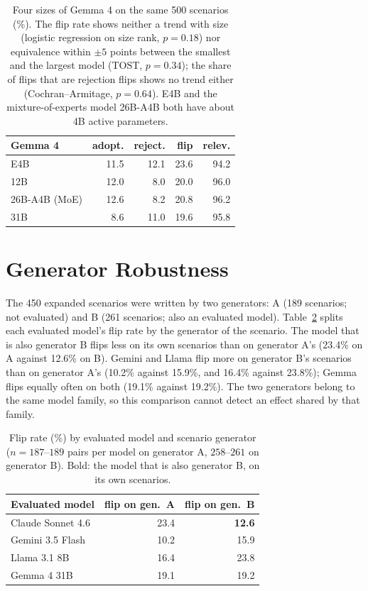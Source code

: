 \documentclass[11pt]{article}
\begin{document}
\begin{table}[h]\centering\small
\begin{tabular}{@{}lrrrr@{}}\toprule
Gemma 4 & adopt. & reject. & flip & relev. \\\midrule
E4B & 11.5 & 12.1 & 23.6 & 94.2 \\
12B & 12.0 & 8.0 & 20.0 & 96.0 \\
26B-A4B (MoE) & 12.6 & 8.2 & 20.8 & 96.2 \\
31B & 8.6 & 11.0 & 19.6 & 95.8 \\\bottomrule
\end{tabular}
\caption{Four sizes of Gemma 4 on the same 500 scenarios (\%). The flip rate shows neither a trend with
size (logistic regression on size rank, $p=0.18$) nor equivalence within $\pm5$ points between the
smallest and the largest model (TOST, $p=0.34$); the share of flips that are rejection flips shows no
trend either (Cochran--Armitage, $p=0.64$). E4B and the mixture-of-experts model 26B-A4B both have about
4B active parameters.}
\label{tab:scale}
\end{table}

\section{Generator Robustness}
\label{app:generator}
The 450 expanded scenarios were written by two generators: A (189 scenarios; not evaluated) and B (261
scenarios; also an evaluated model). Table~\ref{tab:gen} splits each evaluated model's flip rate by the
generator of the scenario. The model that is also generator B flips less on its own scenarios than on
generator A's (23.4\% on A against 12.6\% on B). Gemini and Llama flip more on generator B's scenarios
than on generator A's (10.2\% against 15.9\%, and 16.4\% against 23.8\%); Gemma flips equally often on
both (19.1\% against 19.2\%). The two generators belong to the same model family, so this comparison
cannot detect an effect shared by that family.

\begin{table}[h]\centering\small
\begin{tabular}{@{}lrr@{}}\toprule
Evaluated model & flip on gen.\ A & flip on gen.\ B \\\midrule
Claude Sonnet 4.6 & 23.4 & \textbf{12.6} \\
Gemini 3.5 Flash & 10.2 & 15.9 \\
Llama 3.1 8B & 16.4 & 23.8 \\
Gemma 4 31B & 19.1 & 19.2 \\\bottomrule
\end{tabular}
\caption{Flip rate (\%) by evaluated model and scenario generator ($n=187$--$189$ pairs per model on
generator A, $258$--$261$ on generator B). Bold: the model that is also generator B, on its own
scenarios.}
\label{tab:gen}
\end{table}
\end{document}
